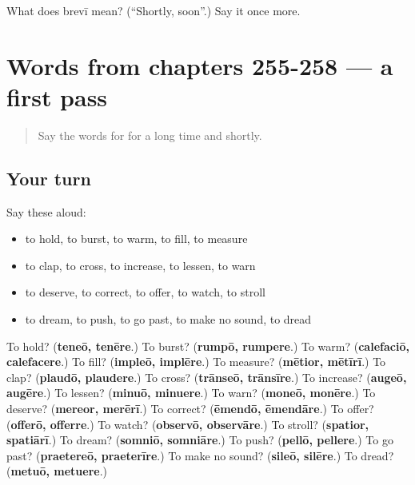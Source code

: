 \begin{tcolorbox}[breakable,colback=teal!4,colframe=teal!35!black,title={Before you move on}]
What does brevī mean? (\textquotedblleft{}Shortly, soon\textquotedblright{}.) Say it once more.
\end{tcolorbox}
\section[(dialogue)]{Words from chapters 255-258 — a first pass}

\label{lesson:LA-R263-first-pass-words-from-chapters-255-258}



\begin{quote}
Say the words for for a long time and shortly.
\end{quote}

\subsection*{Your turn}
Say these aloud:

\begin{itemize}
\raggedright
  \item to hold, to burst, to warm, to fill, to measure
  \item to clap, to cross, to increase, to lessen, to warn
  \item to deserve, to correct, to offer, to watch, to stroll
  \item to dream, to push, to go past, to make no sound, to dread
\end{itemize}

\begin{tcolorbox}[breakable,colback=teal!4,colframe=teal!35!black,title={Before you move on}]
To hold? (\textbf{teneō, tenēre}.) To burst? (\textbf{rumpō, rumpere}.) To warm? (\textbf{calefaciō, calefacere}.) To fill? (\textbf{impleō, implēre}.) To measure? (\textbf{mētior, mētīrī}.) To clap? (\textbf{plaudō, plaudere}.) To cross? (\textbf{trānseō, trānsīre}.) To increase? (\textbf{augeō, augēre}.) To lessen? (\textbf{minuō, minuere}.) To warn? (\textbf{moneō, monēre}.) To deserve? (\textbf{mereor, merērī}.) To correct? (\textbf{ēmendō, ēmendāre}.) To offer? (\textbf{offerō, offerre}.) To watch? (\textbf{observō, observāre}.) To stroll? (\textbf{spatior, spatiārī}.) To dream? (\textbf{somniō, somniāre}.) To push? (\textbf{pellō, pellere}.) To go past? (\textbf{praetereō, praeterīre}.) To make no sound? (\textbf{sileō, silēre}.) To dread? (\textbf{metuō, metuere}.)
\end{tcolorbox}
